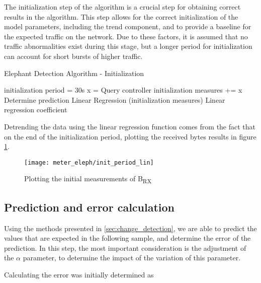 The initialization step of the algorithm is a crucial step for obtaining correct results in the algorithm. This step allows for the correct initialization of the
model parameters, including the trend component, and to provide a baseline for the expected traffic on the network. Due to these factors, it is assumed that no 
traffic abnormalities exist during this stage, but a longer period for initialization can account for short bursts of higher traffic.

\begin{algorithm}[H]
    \caption{Elephant Detection Algorithm - Initialization} \label{alg:high_level}
    \begin{algorithmic}[1]
            \State initialization period = 30s
                \State x = Query controller
                \State initialization measures += x
                \State Determine prediction
            \EndWhile
            \State Linear Regression (initialization measures)
        \State \Return Linear regression coefficient
    \end{algorithmic}
\end{algorithm}

\par Detrending the data using the linear regression function comes from the fact that on the end of the initialization period, plotting the received bytes results
in figure \ref{fig:init_plot}.

\begin{figure} 
    \centering
    \texttt{[image: meter\_eleph/init\_period\_lin]}
    \caption {Plotting the initial measurements of B\textsubscript{RX}}
    \label{fig:init_plot}
\end{figure} 

\subsection{Prediction and error calculation}

Using the methods presented in \ref{sec:change_detection}, we are able to predict the values that are expected in the following sample, and determine the error of
the prediction. In this step, the most important consideration is the adjustment of the $\alpha$ parameter, to determine the impact of the variation of
this parameter.

\par Calculating the error was initially determined as

